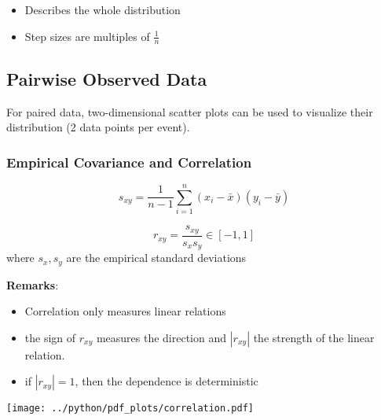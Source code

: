 \begin{itemize}
    \item Describes the whole distribution
    \item Step sizes are multiples of $\frac{1}{n}$
\end{itemize}

\subsection{Pairwise Observed Data}
For paired data, two-dimensional scatter plots can be used to visualize their distribution (2 data points per event).

\subsubsection{Empirical Covariance and Correlation}

\noindent\begin{equation*}
    s_{xy}=\frac{1}{n-1}\sum_{i=1}^n(x_i-\bar{x})(y_i-\bar{y})
\end{equation*}


\noindent\begin{equation*}
    r_{xy}=\frac{s_{xy}}{s_x s_y}\in[-1,1]
\end{equation*}
where $s_x,s_y$ are the empirical standard deviations\

\textbf{Remarks}:
\begin{itemize}
    \item Correlation only measures linear relations
    \item the sign of $r_{xy}$ measures the direction and $|r_{xy}|$ the strength of the linear relation.
    \item if $|r_{xy}|=1$, then the dependence is deterministic
\end{itemize}
\begin{center}
    \texttt{[image: ../python/pdf\_plots/correlation.pdf]}
\end{center}
